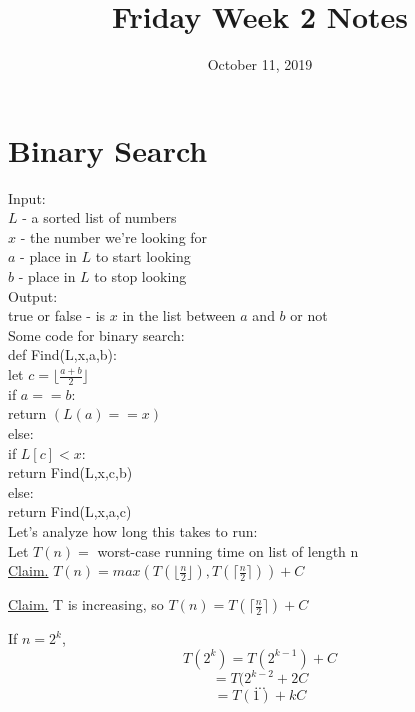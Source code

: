 \documentclass[12pt]{amsart}
\title{Friday Week 2 Notes}
\date{October 11, 2019}
\begin{document}
\maketitle


\section{Binary Search}

Input: \\
$L$ - a sorted list of numbers\\
$x$ - the number we're looking for\\
$a$ - place in $L$ to start looking\\
$b$ - place in $L$ to stop looking\\

Output:\\
true or false - is $x$ in the list between $a$ and $b$ or not\\

Some code for binary search: \\ 

def Find(L,x,a,b):\\
\indent \indent \indent let $c = \lfloor{\frac{a+b}{2}\rfloor}$\\
\indent \indent \indent if $a = = b$:\\
\indent \indent \indent \indent \indent \indent return $(L(a) = = x)$\\
\indent \indent \indent else:\\
\indent \indent \indent \indent \indent \indent if $L[c] < x:$\\
\indent \indent \indent \indent \indent \indent \indent \indent \indent return Find(L,x,c,b)\\
\indent \indent \indent \indent \indent \indent else:\\
\indent \indent \indent \indent \indent \indent \indent \indent \indent return Find(L,x,a,c)\\

Let's analyze how long this takes to run:\\
Let $T(n) = $ worst-case running time on list of length n\\
\underline{Claim.} $T(n) = max\left(T(\lfloor{\frac{n}{2}\rfloor}), T(\lceil{\frac{n}{2}\rceil})\right) + C$
\vspace{10mm}

\underline{Claim.} T is increasing, so $T(n) = T(\lceil{\frac{n}{2}\rceil}) + C$ 

If $n = 2^k$, 
$$T(2^k) = T(2^{k-1}) + C$$
$$ = T(2^{k-2} + 2C$$
$$...$$
$$ = T(1) + kC$$
\end{document}
